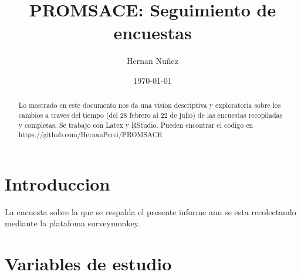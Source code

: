 \documentclass{article}
\begin{document}

\title{PROMSACE: Seguimiento de encuestas}
\author{Hernan Nuñez}
\date{\today}
\maketitle
\begin{abstract}
Lo mostrado en este documento nos da una vision descriptiva y exploratoria sobre los cambios a traves del tiempo (del 28 febrero al 22 de julio) de las encuestas recopiladas y completas. Se trabajo con Latex y RStudio. Pueden encontrar el codigo en https://github.com/HernanPerci/PROMSACE
\end{abstract}

\tableofcontents

\section{Introduccion}
La encuesta sobre la que se respalda el presente informe aun se esta recolectando mediante la platafoma surveymonkey.

\section{Variables de estudio}
\end{document}
